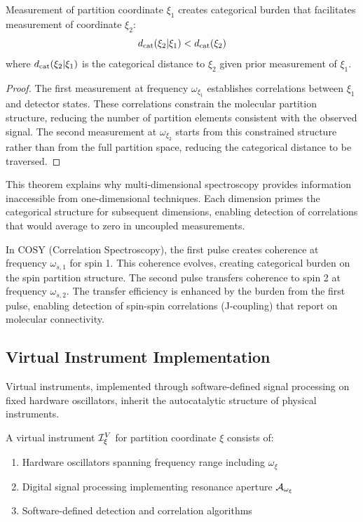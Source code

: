 \begin{theorem}
\label{thm:cross_coordinate}
Measurement of partition coordinate $\xi_1$ creates categorical burden that facilitates measurement of coordinate $\xi_2$:
\begin{equation}
d_{\mathrm{cat}}(\xi_2 | \xi_1) < d_{\mathrm{cat}}(\xi_2)
\end{equation}
where $d_{\mathrm{cat}}(\xi_2 | \xi_1)$ is the categorical distance to $\xi_2$ given prior measurement of $\xi_1$.
\end{theorem}

\begin{proof}
The first measurement at frequency $\omega_{\xi_1}$ establishes correlations between $\xi_1$ and detector states. These correlations constrain the molecular partition structure, reducing the number of partition elements consistent with the observed signal. The second measurement at $\omega_{\xi_2}$ starts from this constrained structure rather than from the full partition space, reducing the categorical distance to be traversed.
\end{proof}

This theorem explains why multi-dimensional spectroscopy provides information inaccessible from one-dimensional techniques. Each dimension primes the categorical structure for subsequent dimensions, enabling detection of correlations that would average to zero in uncoupled measurements.

\begin{example}
In COSY (Correlation Spectroscopy), the first pulse creates coherence at frequency $\omega_{s,1}$ for spin 1. This coherence evolves, creating categorical burden on the spin partition structure. The second pulse transfers coherence to spin 2 at frequency $\omega_{s,2}$. The transfer efficiency is enhanced by the burden from the first pulse, enabling detection of spin-spin correlations (J-coupling) that report on molecular connectivity.
\end{example}

\subsection{Virtual Instrument Implementation}

Virtual instruments, implemented through software-defined signal processing on fixed hardware oscillators, inherit the autocatalytic structure of physical instruments.

\begin{definition}
\label{def:virtual_instrument}
A virtual instrument $\mathcal{I}^V_\xi$ for partition coordinate $\xi$ consists of:
\begin{enumerate}
\item Hardware oscillators spanning frequency range including $\omega_\xi$
\item Digital signal processing implementing resonance aperture $\mathcal{A}_{\omega_\xi}$
\item Software-defined detection and correlation algorithms
\end{enumerate}
\end{definition}

